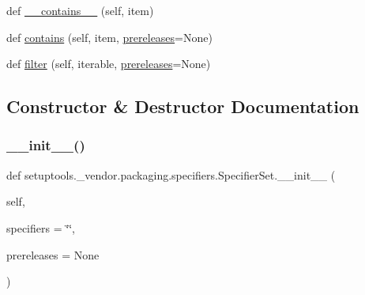 \begin{DoxyCompactItemize}
\item 
def \hyperlink{classsetuptools_1_1__vendor_1_1packaging_1_1specifiers_1_1SpecifierSet_a883c1e784aebcb300e68cd5e08c7ea8a}{\+\_\+\+\_\+contains\+\_\+\+\_\+} (self, item)
\item 
def \hyperlink{classsetuptools_1_1__vendor_1_1packaging_1_1specifiers_1_1SpecifierSet_ade45c15d94a7692b74992f5debb832d2}{contains} (self, item, \hyperlink{classsetuptools_1_1__vendor_1_1packaging_1_1specifiers_1_1SpecifierSet_a853e4fea5cc762607cd242de08e83b9b}{prereleases}=None)
\item 
def \hyperlink{classsetuptools_1_1__vendor_1_1packaging_1_1specifiers_1_1SpecifierSet_aab85eed95b9ea9c4a9a5f88cf8fd5da5}{filter} (self, iterable, \hyperlink{classsetuptools_1_1__vendor_1_1packaging_1_1specifiers_1_1SpecifierSet_a853e4fea5cc762607cd242de08e83b9b}{prereleases}=None)
\end{DoxyCompactItemize}


\subsection{Constructor \& Destructor Documentation}
\mbox{\label{classsetuptools_1_1__vendor_1_1packaging_1_1specifiers_1_1SpecifierSet_a89508eb490090d8c31195cae72666503}} 
\subsubsection{\texorpdfstring{\+\_\+\+\_\+init\+\_\+\+\_\+()}{\_\_init\_\_()}}
{\footnotesize\ttfamily def setuptools.\+\_\+vendor.\+packaging.\+specifiers.\+Specifier\+Set.\+\_\+\+\_\+init\+\_\+\+\_\+ (\begin{DoxyParamCaption}\item[{}]{self,  }\item[{}]{specifiers = {\ttfamily \char`\"{}\char`\"{}},  }\item[{}]{prereleases = {\ttfamily None} }\end{DoxyParamCaption})}



